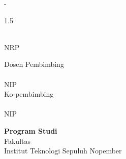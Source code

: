 \begin{large}
  \ifdefined\coverdoctypename\coverdoctypename\else\doctypename\fi{} - \coursecode{}
\end{large}

\vspace{\fill}

\begin{spacing}{1.5}
  \begin{Large}
    \tatitle{}
  \end{Large}
\end{spacing}

\vspace{\fill}

\begin{large}
  \name{} \\
  \textmd{NRP \nrp{}}
\end{large}

\vspace{\fill}

\begin{large}
  \textmd{Dosen Pembimbing} \\
  \textbf{\advisor{}} \\
  \ifstrequal{\advisornip}{-}{}{\textmd{NIP \advisornip{}}\\}%
  \ifstrequal{\coadvisor}{-}{}{%
    \ifdefined\coadvisorrole\textmd{\coadvisorrole{}}\else\textmd{Ko-pembimbing}\fi \\
    \textbf{\coadvisor{}}%
    \ifstrequal{\coadvisornip}{-}{}{\\\textmd{NIP \coadvisornip{}}}%
  }
\end{large}

\vspace{\fill}

\begin{large}
  \textbf{Program Studi \studyprogram{}} \\
  \textmd{Fakultas \faculty{}} \\
  \textmd{Institut Teknologi Sepuluh Nopember} \\
  \textmd{\place{}} \\
  \textmd{\the\year{}}
\end{large}
